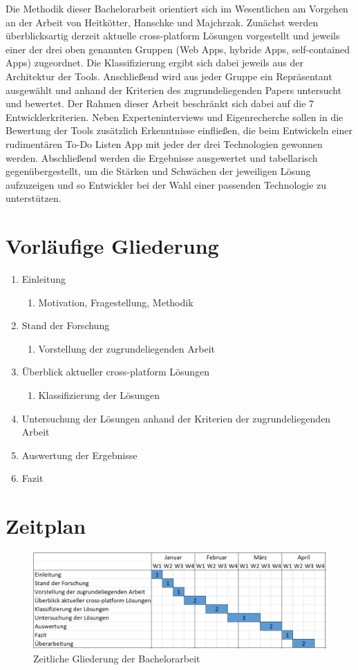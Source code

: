 Die Methodik dieser Bachelorarbeit orientiert sich im Wesentlichen am Vorgehen an der Arbeit von Heitkötter, Hanschke und Majchrzak. Zunächst werden überblicksartig derzeit aktuelle cross-platform Lösungen vorgestellt und jeweils einer der drei oben genannten Gruppen (Web Apps, hybride Apps, self-contained Apps) zugeordnet. Die Klassifizierung ergibt sich dabei jeweils aus der Architektur der Tools.
Anschließend wird aus jeder Gruppe ein Repräsentant ausgewählt und anhand der Kriterien des zugrundeliegenden Papers untersucht und bewertet. Der Rahmen dieser Arbeit beschränkt sich dabei auf die 7 Entwicklerkriterien.
Neben Experteninterviews und Eigenrecherche sollen in die Bewertung der Tools zusätzlich Erkenntnisse einfließen, die beim Entwickeln einer rudimentären To-Do Listen App mit jeder der drei Technologien gewonnen werden.
Abschließend werden die Ergebnisse ausgewertet und tabellarisch gegenübergestellt, um die Stärken und Schwächen der jeweiligen Lösung aufzuzeigen und so Entwickler bei der Wahl einer passenden Technologie zu unterstützen.

\section*{Vorläufige Gliederung}

\begin{enumerate}
\item Einleitung
\begin{enumerate}[label*=\arabic*.]
\item Motivation, Fragestellung, Methodik
\end{enumerate}
\item Stand der Forschung
\begin{enumerate}[label*=\arabic*.]
\item Vorstellung der zugrundeliegenden Arbeit
\end{enumerate}
\item Überblick aktueller cross-platform Lösungen
\begin{enumerate}[label*=\arabic*.]
\item Klassifizierung der Lösungen
\end{enumerate}
\item Untersuchung der Lösungen anhand der Kriterien der zugrundeliegenden Arbeit
\item Auswertung der Ergebnisse
\item Fazit 
\end{enumerate}

 \section*{Zeitplan}
 \begin{figure}[H]
	\renewcommand*\figurename{Abbildung}
		\begin{center}
			\includegraphics[width=1\textwidth]{timetable.png}
		\end{center}
		\caption{Zeitliche Gliederung der Bachelorarbeit}
	\end{figure}